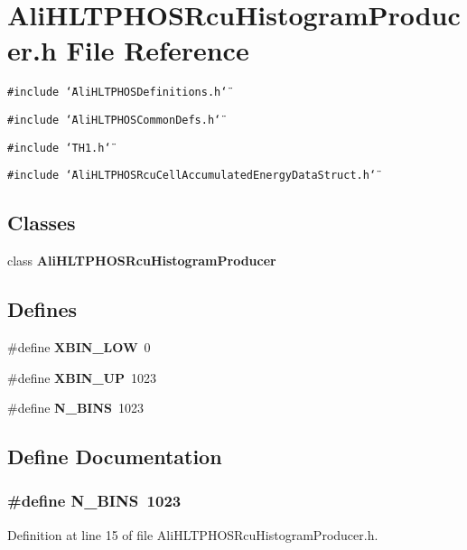 \section{Ali\-HLTPHOSRcu\-Histogram\-Producer.h File Reference}
\label{AliHLTPHOSRcuHistogramProducer_8h}


{\tt \#include \char`\"{}Ali\-HLTPHOSDefinitions.h\char`\"{}}\par
{\tt \#include \char`\"{}Ali\-HLTPHOSCommon\-Defs.h\char`\"{}}\par
{\tt \#include \char`\"{}TH1.h\char`\"{}}\par
{\tt \#include \char`\"{}Ali\-HLTPHOSRcu\-Cell\-Accumulated\-Energy\-Data\-Struct.h\char`\"{}}\par
\subsection*{Classes}
\begin{CompactItemize}
\item 
class {\bf Ali\-HLTPHOSRcu\-Histogram\-Producer}
\end{CompactItemize}
\subsection*{Defines}
\begin{CompactItemize}
\item 
\#define {\bf XBIN\_\-LOW}\ 0
\item 
\#define {\bf XBIN\_\-UP}\ 1023
\item 
\#define {\bf N\_\-BINS}\ 1023
\end{CompactItemize}


\subsection{Define Documentation}
\subsubsection{\setlength{\rightskip}{0pt plus 5cm}\#define N\_\-BINS\ 1023}\label{AliHLTPHOSRcuHistogramProducer_8h_a2}




Definition at line 15 of file Ali\-HLTPHOSRcu\-Histogram\-Producer.h.

